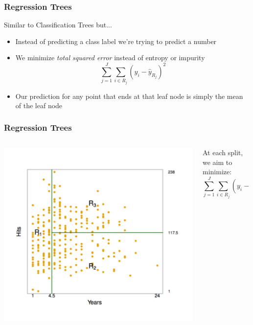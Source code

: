 \documentclass[table,dvipsnames]{beamer}
\begin{document}

\begin{frame}
\frametitle{Regression Trees}
Similar to Classification Trees but...
\begin{itemize}
    \item Instead of predicting a class label we're trying to predict a number
    \item We minimize \textit{total squared error} instead of entropy or impurity
    \begin{equation}
        \sum_{j=1}^J \sum_{i \in R_j} (y_i - \hat{y}_{R_j})^2
    \end{equation}
    \item Our prediction for any point that ends at that leaf node is simply the mean of the leaf node
\end{itemize}
\end{frame}


\begin{frame}
\frametitle{Regression Trees}
\begin{columns}[T]
\begin{column}{.48\textwidth}
    \begin{center}
    \includegraphics[scale=0.4]{imgs/regression_tree_example2.png}
    \end{center}
\end{column}
\begin{column}{.48\textwidth}
    At each split, we aim to minimize:
    $$\sum_{j=1}^J \sum_{i \in R_j} (y_i - \hat{y}_{R_j})^2$$
\end{column}
\end{columns}
\end{frame}
\end{document}

